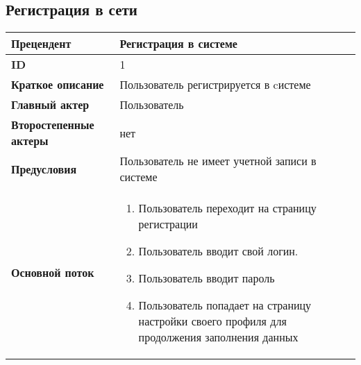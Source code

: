 \documentclass{article}
\begin{document}
\subsection{Регистрация в сети}
\begin{center}
  \begin{tabular}{|l|p{9cm}|}
  \hline
  \textbf{Прецендент} & Регистрация в системе \\
  \hline
  \textbf{ID} & 1 \\
  \hline
  \textbf{Краткое описание} & Пользователь регистрируется в cистеме \\
  \hline
  \textbf{Главный актер} & Пользователь\\
  \hline
  \textbf{Второстепенные актеры} & нет \\
  \hline
  \textbf{Предусловия} &  Пользователь не имеет учетной записи в системе\\
  \hline
  \textbf{Основной поток} & \begin{enumerate}
    \item Пользователь переходит на страницу регистрации
    \item Пользователь вводит свой логин.
    \item Пользователь вводит пароль
    \item Пользователь попадает на страницу настройки своего профиля для продолжения заполнения данных
  \end{enumerate} \\
  \hline
\end{tabular}

	\subsection{}


\end{center}
\end{document}
